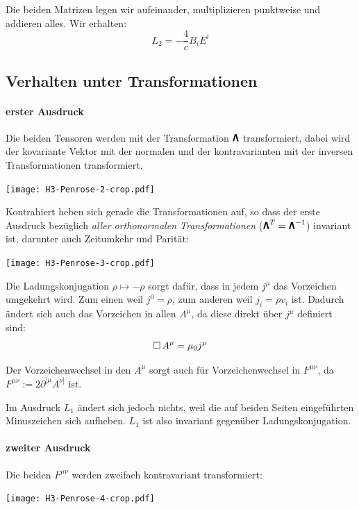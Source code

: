 Die beiden Matrizen legen wir aufeinander, multiplizieren punktweise und
addieren alles. Wir erhalten:
\[
	L_2 = - \frac 4c B_i E^i
\]

\subsection{Verhalten unter Transformationen}

\paragraph{erster Ausdruck}

Die beiden Tensoren werden mit der Transformation $\boldsymbol{\mathsf{\Lambda}}$
transformiert, dabei wird der kovariante Vektor mit der normalen und der
kontravarianten mit der inversen Transformationen transformiert.
\begin{center}
	\texttt{[image: H3-Penrose-2-crop.pdf]}
\end{center}

Kontrahiert heben sich gerade die Transformationen auf, so dass der erste
Ausdruck bezüglich \emph{aller orthonormalen Transformationen} ($\boldsymbol{\mathsf{\Lambda}}^T = \boldsymbol{\mathsf{\Lambda}}^{-1}$) invariant ist, darunter auch Zeitumkehr und
Parität:
\begin{center}
	\texttt{[image: H3-Penrose-3-crop.pdf]}
\end{center}

Die Ladungskonjugation $\rho \mapsto -\rho$ sorgt dafür, dass in jedem $j^\mu$
das Vorzeichen umgekehrt wird. Zum einen weil $j^0 = \rho$, zum anderen weil
$j_i = \rho v_i$ ist. Dadurch ändert sich auch das Vorzeichen in allen $A^\mu$,
da diese direkt über $j^\mu$ definiert sind:
\[
	\operatorname{\Box} A^\mu = \mu_0 j^\mu
\]

Der Vorzeichenwechsel in den $A^\mu$ sorgt auch für Vorzeichenwechsel in
$F^{\mu\nu}$, da $F^{\mu\nu} := 2 \partial^{[\mu} A^{\nu]}$ ist.

Im Ausdruck $L_1$ ändert sich jedoch nichts, weil die auf beiden Seiten
eingeführten Minuszeichen sich aufheben. $L_1$ ist also invariant gegenüber
Ladungskonjugation.

\paragraph{zweiter Ausdruck}

Die beiden $F^{\mu\nu}$ werden zweifach kontravariant transformiert:
\begin{center}
	\texttt{[image: H3-Penrose-4-crop.pdf]}
\end{center}

